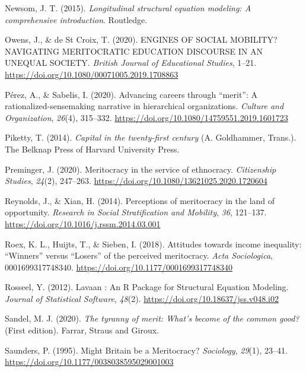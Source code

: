\documentclass[
  10pt,
  a4paper,
]{article}
\newlength{\cslhangindent}
\newenvironment{CSLReferences}[2] %
 {\begin{list}{}{%
  \setlength{\itemindent}{0pt}
  \setlength{\leftmargin}{0pt}
  \setlength{\parsep}{0pt}
  \ifodd #1
   \setlength{\leftmargin}{\cslhangindent}
   \setlength{\itemindent}{-1\cslhangindent}
  \fi
  \setlength{\itemsep}{#2\baselineskip}}}
 {\end{list}}
\begin{document}
\begin{CSLReferences}{1}{0}
Newsom, J. T. (2015). \emph{Longitudinal structural equation modeling: {A} comprehensive introduction}. {Routledge}.

Owens, J., \& de St Croix, T. (2020). {ENGINES OF SOCIAL MOBILITY}? {NAVIGATING MERITOCRATIC EDUCATION DISCOURSE IN AN UNEQUAL SOCIETY}. \emph{British Journal of Educational Studies}, 1--21. \url{https://doi.org/10.1080/00071005.2019.1708863}

Pérez, A., \& Sabelis, I. (2020). Advancing careers through {``merit''}: A rationalized-sensemaking narrative in hierarchical organizations. \emph{Culture and Organization}, \emph{26}(4), 315--332. \url{https://doi.org/10.1080/14759551.2019.1601723}

Piketty, T. (2014). \emph{Capital in the twenty-first century} (A. Goldhammer, Trans.). {The Belknap Press of Harvard University Press}.

Preminger, J. (2020). Meritocracy in the service of ethnocracy. \emph{Citizenship Studies}, \emph{24}(2), 247--263. \url{https://doi.org/10.1080/13621025.2020.1720604}

Reynolds, J., \& Xian, H. (2014). Perceptions of meritocracy in the land of opportunity. \emph{Research in Social Stratification and Mobility}, \emph{36}, 121--137. \url{https://doi.org/10.1016/j.rssm.2014.03.001}

Roex, K. L., Huijts, T., \& Sieben, I. (2018). Attitudes towards income inequality: {``{Winners}''} versus {``{Losers}''} of the perceived meritocracy. \emph{Acta Sociologica}, 0001699317748340. \url{https://doi.org/10.1177/0001699317748340}

Rosseel, Y. (2012). Lavaan : {An R Package} for {Structural Equation Modeling}. \emph{Journal of Statistical Software}, \emph{48}(2). \url{https://doi.org/10.18637/jss.v048.i02}

Sandel, M. J. (2020). \emph{The tyranny of merit: {What}'s become of the common good?} (First edition). {Farrar, Straus and Giroux}.

Saunders, P. (1995). Might {Britain} be a {Meritocracy}? \emph{Sociology}, \emph{29}(1), 23--41. \url{https://doi.org/10.1177/0038038595029001003}


\end{CSLReferences}
\end{document}
